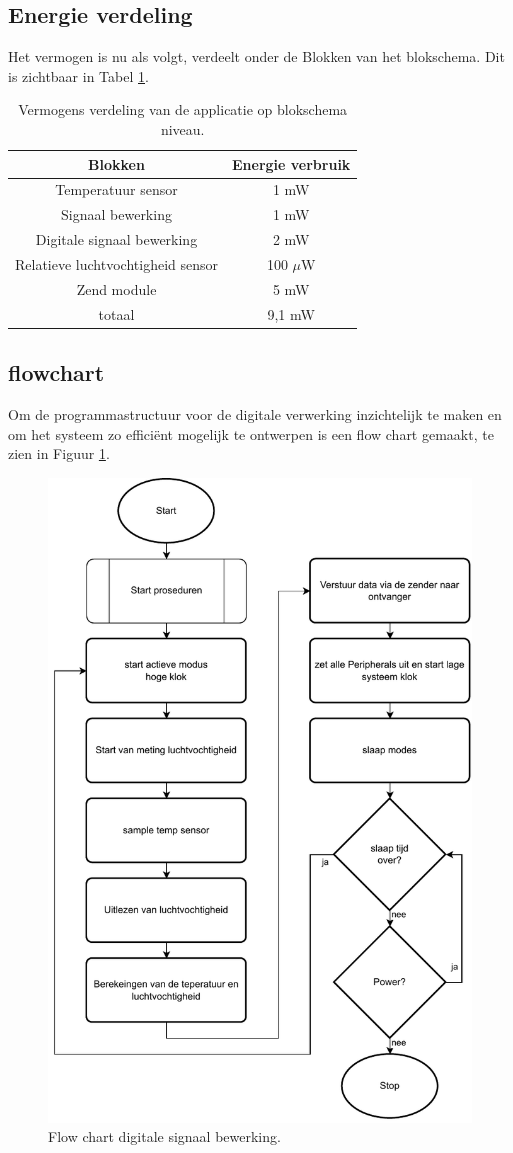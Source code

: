 \subsection{Energie verdeling}
Het vermogen is nu als volgt, verdeelt onder de Blokken van het blokschema. Dit is zichtbaar in Tabel \ref{tab:Energie_verbruik_blok_schema}.
\begin{table}[H]
    \centering
    \begin{tabular}{|c|c|}
        \hline
        \textbf{Blokken} & \textbf{Energie verbruik} \\ \hline
        Temperatuur sensor & 1 mW \\ \hline
        Signaal bewerking  & 1 mW \\ \hline
        Digitale signaal bewerking & 2 mW \\ \hline
        Relatieve luchtvochtigheid sensor & 100 $\mu$W \\ \hline
        Zend module & 5 mW \\ \hline
        totaal  & 9,1 mW \\ \hline

    \end{tabular}
    \caption{Vermogens verdeling van de applicatie op blokschema niveau.}
    \label{tab:Energie_verbruik_blok_schema}
\end{table}

\newpage
\subsection{flowchart}
Om de programmastructuur voor de digitale verwerking inzichtelijk te maken en om het systeem zo efficiënt mogelijk te ontwerpen is een flow chart gemaakt, te zien in Figuur \ref{fig:flow_chart}.
\newline
\begin{figure}[H]
    \centering
    \includegraphics[width=0.65\linewidth]{pictures/jochem_flowchart.drawio.pdf}
    \caption{Flow chart digitale signaal bewerking.}
    \label{fig:flow_chart}
\end{figure}

